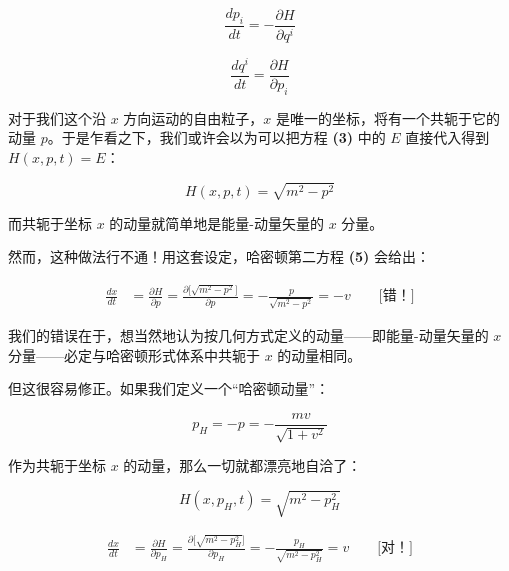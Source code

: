 \begin{equation}
\frac{dp_{i}}{dt} = -\frac{\partial H}{\partial q^{i}} \tag{4}
\end{equation}

\begin{equation}
\frac{dq^{i}}{dt} = \frac{\partial H}{\partial p_{i}} \tag{5}
\end{equation}

对于我们这个沿 $x$ 方向运动的自由粒子，$x$ 是唯一的坐标，将有一个共轭于它的动量 $p$。于是乍看之下，我们或许会以为可以把方程 \textbf{(3)} 中的 $E$ 直接代入得到 $H(x,p,t)=E$：

\begin{equation}
H(x,p,t) = \sqrt{m^{2}-p^{2}} \tag{6}
\end{equation}

而共轭于坐标 $x$ 的动量就简单地是能量-动量矢量的 $x$ 分量。

然而，这种做法行不通！用这套设定，哈密顿第二方程 \textbf{(5)} 会给出：

\begin{equation}
\begin{aligned}
\frac{dx}{dt} &= \frac{\partial H}{\partial p}
= \frac{\partial\bigl[\sqrt{m^{2}-p^{2}}\bigr]}{\partial p}
= -\frac{p}{\sqrt{m^{2}-p^{2}}}
= -v \qquad \textbf{[错！]}
\end{aligned}
\tag{7}
\end{equation}

我们的错误在于，想当然地认为按几何方式定义的动量——即能量-动量矢量的 $x$ 分量——必定与哈密顿形式体系中共轭于 $x$ 的动量相同。

但这很容易修正。如果我们定义一个“哈密顿动量”：

\begin{equation}
p_{H} = -p = -\frac{mv}{\sqrt{1+v^{2}}} \tag{8}
\end{equation}

作为共轭于坐标 $x$ 的动量，那么一切就都漂亮地自洽了：

\begin{equation}
H(x,p_{H},t) = \sqrt{m^{2}-p_{H}^{2}} \tag{9}
\end{equation}

\begin{equation}
\begin{aligned}
\frac{dx}{dt} &= \frac{\partial H}{\partial p_{H}}
= \frac{\partial\bigl[\sqrt{m^{2}-p_{H}^{2}}\bigr]}{\partial p_{H}}
= -\frac{p_{H}}{\sqrt{m^{2}-p_{H}^{2}}}
= v \qquad \textbf{[对！]}
\end{aligned}
\tag{10}
\end{equation}

